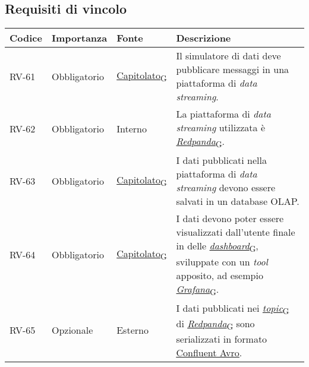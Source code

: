 \subsection{Requisiti di vincolo}
\begin{longtable}{|>{\centering\arraybackslash}m{}|>{\centering\arraybackslash}m{}|>{\centering\arraybackslash}m{}|>{\centering\arraybackslash}m{}|}
	\hline
	\textbf{Codice} & \textbf{Importanza} & \textbf{Fonte}                                                                                                    & \textbf{Descrizione}
	\\\hline
	\endfirsthead
	\hline
	\endhead
	RV-61           & Obbligatorio        & \href{https://7last.github.io/docs/rtb/documentazione-interna/glossario\#capitolato}{Capitolato\textsubscript{G}} & Il simulatore di dati deve pubblicare messaggi in una piattaforma di \textit{data streaming}.
	\\\hline
	RV-62           & Obbligatorio        & Interno                                                                                                           & La piattaforma di \textit{data streaming} utilizzata è \href{https://7last.github.io/docs/rtb/documentazione-interna/glossario\#redpanda}{\textit{Redpanda}\textsubscript{G}}.
	\\\hline
	RV-63           & Obbligatorio        & \href{https://7last.github.io/docs/rtb/documentazione-interna/glossario\#capitolato}{Capitolato\textsubscript{G}} & I dati pubblicati nella piattaforma di \textit{data streaming} devono essere salvati in un database OLAP.
	\\\hline
	RV-64           & Obbligatorio        & \href{https://7last.github.io/docs/rtb/documentazione-interna/glossario\#capitolato}{Capitolato\textsubscript{G}} & I dati devono poter essere visualizzati dall'utente finale in delle \href{https://7last.github.io/docs/rtb/documentazione-interna/glossario\#dashboard}{\textit{dashboard}\textsubscript{G}}, sviluppate con un \textit{tool} apposito, ad esempio \href{https://7last.github.io/docs/rtb/documentazione-interna/glossario\#grafana}{\textit{Grafana}\textsubscript{G}}.
	\\\hline
	RV-65           & Opzionale           & Esterno                                                                                                           & I dati pubblicati nei \href{https://7last.github.io/docs/rtb/documentazione-interna/glossario\#topic}{\textit{topic}\textsubscript{G}} di \href{https://7last.github.io/docs/rtb/documentazione-interna/glossario\#redpanda}{\textit{Redpanda}\textsubscript{G}} sono serializzati in formato \href{https://docs.confluent.io/platform/current/schema-registry/fundamentals/serdes-develop/serdes-avro.html}{\underline{Confluent Avro}}.

\end{longtable}

